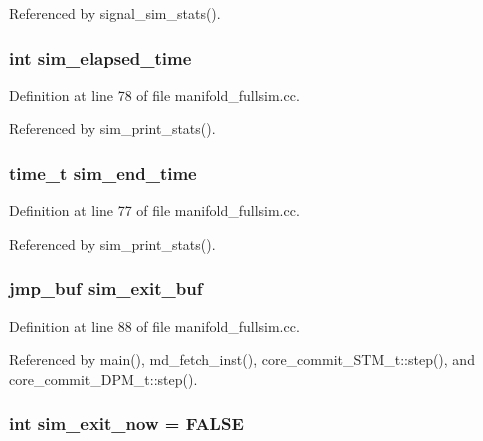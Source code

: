 Referenced by signal\_\-sim\_\-stats().
\subsubsection[{sim\_\-elapsed\_\-time}]{\setlength{\rightskip}{0pt plus 5cm}int {\bf sim\_\-elapsed\_\-time}}\label{manifold__fullsim_8cc_84462569a8ea1951d2547b98eaa30f25}




Definition at line 78 of file manifold\_\-fullsim.cc.

Referenced by sim\_\-print\_\-stats().
\subsubsection[{sim\_\-end\_\-time}]{\setlength{\rightskip}{0pt plus 5cm}time\_\-t {\bf sim\_\-end\_\-time}}\label{manifold__fullsim_8cc_5db757faa4910d3f30bfddc7c81261e8}




Definition at line 77 of file manifold\_\-fullsim.cc.

Referenced by sim\_\-print\_\-stats().
\subsubsection[{sim\_\-exit\_\-buf}]{\setlength{\rightskip}{0pt plus 5cm}jmp\_\-buf {\bf sim\_\-exit\_\-buf}}\label{manifold__fullsim_8cc_84727c65b24d2e32fd3d4a7af53aa15a}




Definition at line 88 of file manifold\_\-fullsim.cc.

Referenced by main(), md\_\-fetch\_\-inst(), core\_\-commit\_\-STM\_\-t::step(), and core\_\-commit\_\-DPM\_\-t::step().
\subsubsection[{sim\_\-exit\_\-now}]{\setlength{\rightskip}{0pt plus 5cm}int {\bf sim\_\-exit\_\-now} = FALSE}\label{manifold__fullsim_8cc_e6c582e7e1a51970f03ee0c8bb8776df}





